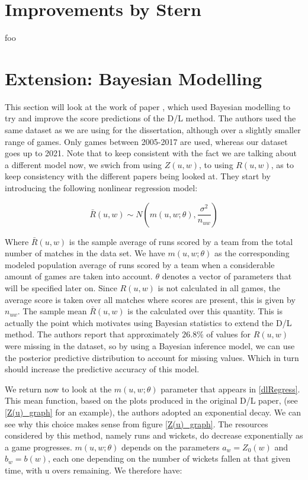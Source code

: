 \section{Improvements by Stern}
foo


\section{Extension: Bayesian Modelling}
This section will look at the work of paper \cite{dlbayes}, which used Bayesian modelling to try and improve the score predictions
of the D/L method. The authors used the same dataset as we are using for the dissertation, although over a slightly smaller range of games.
Only games between 2005-2017 are used, whereas our dataset goes up to 2021. Note that to keep consistent with the fact we are talking about a different
model now, we swich from using $Z(u,w)$, to using $R(u,w)$, as to keep consistency with the different papers being looked at.
They start by introducing the following nonlinear regression model:

\begin{equation}
    \label{dlRegress}
    \bar{R}(u,w) \sim N(m(u,w;\theta),\frac{\sigma^2}{n_{uw}})
\end{equation}

Where $\bar{R}(u,w)$ is the sample average of runs scored by a team from the total number of matches in the data set. We have $m(u,w;\theta)$
as the corresponding modeled population average of runs scored by a team when a considerable amount of games are taken into account. $\theta$ denotes 
a vector of parameters that will be specified later on. Since $R(u,w)$ is not calculated in all games, the average score is taken over all matches where
scores are present, this is given by $n_{uw}$. The sample mean $\bar{R}(u,w)$ is the calculated over this quantity. This is actually the point which motivates
using Bayesian statistics to extend the D/L method. The authors report that approximately $26.8\%$ of values for $R(u,w)$ were missing in the dataset, so by 
using a Bayesian inference model, we can use the posterior predictive distribution to account for missing values. Which in turn should increase the 
predictive accuracy of this model.

We return now to look at the $m(u,w;\theta)$ parameter that appears in \ref{dlRegress}. This mean function, based on the plots produced in the original D/L
paper, (see \ref{Z(u)_graph} for an example), the authors adopted an exponential decay. We can see why this choice makes sense from figure \ref{Z(u)_graph}.
The resources considered by this method, namely runs and wickets, do decrease exponentially as a game progresses. $m(u,w;\theta)$ depends on the parameters
$a_w = Z_0(w)$ and $b_w = b(w)$, each one depending on the number of wickets fallen at that given time, with u overs remaining. We therefore have:

